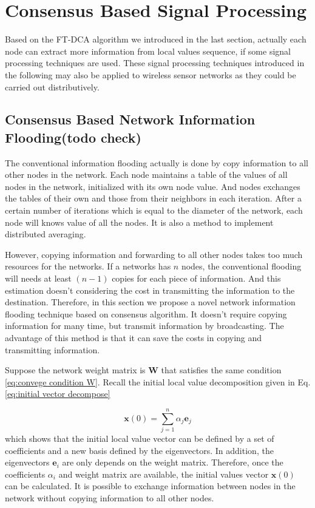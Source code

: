 
\section{Consensus Based Signal Processing}

Based on the FT-DCA algorithm we introduced in the last section, actually
each node can extract more information from local values sequence,
if some signal processing techniques are used. These signal processing
techniques introduced in the following may also be applied to wireless
sensor networks as they could be carried out distributively. 


\subsection{Consensus Based Network Information Flooding(todo check)}

The conventional information flooding actually is done by copy information
to all other nodes in the network. Each node maintains a table of
the values of all nodes in the network, initialized with its own node
value. And nodes exchanges the tables of their own and those from
their neighbors in each iteration. After a certain number of iterations
which is equal to the diameter of the network, each node will knows
value of all the nodes. It is also a method to implement distributed
averaging. 

However, copying information and forwarding to all other nodes takes
too much resources for the networks. If a networks has $n$ nodes,
the conventional flooding will needs at least $\left(n-1\right)$
copies for each piece of information. And this estimation doesn't
considering the cost in transmitting the information to the destination.
Therefore, in this section we propose a novel network information
flooding technique based on consensus algorithm. It doesn't require
copying information for many time, but transmit information by broadcasting.
The advantage of this method is that it can save the costs in copying
and transmitting information. 

Suppose the network weight matrix is $\mathbf{W}$ that satisfies
the same condition \ref{eq:convege condition W}. Recall the initial
local value decomposition given in Eq.\eqref{eq:initial vector decompose}

\begin{equation}
\mathbf{x}\left(0\right)=\sum_{j=1}^{n}\alpha_{j}\mathbf{e}_{j}\label{eq:initial vector decompose}
\end{equation}
which shows that the initial local value vector can be defined by
a set of coefficients and a new basis defined by the eigenvectors.\textbf{
}In addition, the eigenvectors $\mathbf{e}_{i}$ are only depends
on the weight matrix. Therefore, once the coefficients $\alpha_{i}$
and weight matrix are available, the initial values vector $\mathbf{x}\left(0\right)$
can be calculated. It is possible to exchange information between
nodes in the network without copying information to all other nodes.

